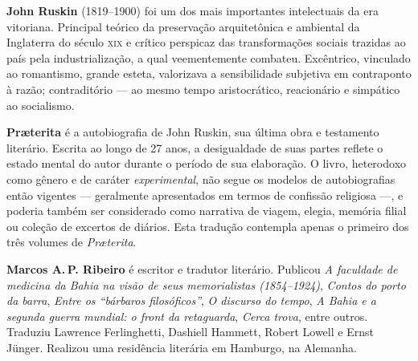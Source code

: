 \textbf{John Ruskin} (1819--1900) foi um dos mais importantes intelectuais da era vitoriana. Principal teórico da preservação arquitetônica e ambiental da Inglaterra do século \textsc{xix} e crítico perspicaz das transformações sociais trazidas ao país pela industrialização, a qual veementemente combateu. Excêntrico, vinculado ao romantismo, grande esteta, valorizava a sensibilidade subjetiva em contraponto à razão; contraditório --- ao mesmo tempo aristocrático, reacionário e simpático ao socialismo.

\textbf{Pr\ae terita} é a autobiografia de John Ruskin, sua última obra e testamento literário. Escrita ao longo de 27 anos, a desigualdade de suas partes reflete o estado mental do autor durante o período de sua elaboração. O livro, heterodoxo como gênero e de caráter \textit{experimental}, não segue os modelos de autobiografias então vigentes --- geralmente apresentados em termos de confissão religiosa ---, e poderia também ser considerado como narrativa de viagem, elegia, memória filial ou coleção de excertos de diários. Esta tradução contempla apenas o primeiro dos três volumes de \textit{Pr\ae terita}.

\textbf{Marcos A.\,P. Ribeiro} é escritor e tradutor literário. Publicou \textit{A faculdade de medicina da Bahia na visão de seus memorialistas (1854--1924)}, \textit{Contos do porto da barra}, \textit{Entre os “bárbaros filosóficos”}, \textit{O discurso do tempo}, \textit{A Bahia e a segunda guerra mundial: o front da retaguarda}, \textit{Cerca trova}, entre outros. Traduziu Lawrence Ferlinghetti, Dashiell Hammett, Robert Lowell e Ernst Jünger. Realizou uma residência literária em Hamburgo, na Alemanha.





